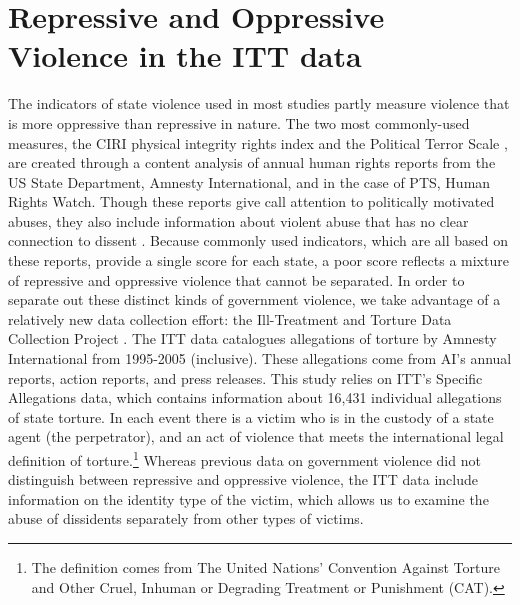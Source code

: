 \documentclass[11pt]{article}
\begin{document}
\section*{Repressive and Oppressive Violence in the ITT data} 
The indicators of state violence used in most studies partly measure violence that is more oppressive than repressive in nature. The two most commonly-used measures, the CIRI physical integrity rights index \citep{CIRI2014} and the Political Terror Scale \citep{PTS2018}, are created through a content analysis of annual human rights reports from the US State Department, Amnesty International, and in the case of PTS, Human Rights Watch. Though these reports give call attention to politically motivated abuses, they also include information about violent abuse that has no clear connection to dissent \citep[][pp.\ 13--16, 90--91]{Haschke2018}. Because commonly used indicators, which are all based on these reports, provide a single score for each state, a poor score reflects a mixture of repressive and oppressive violence that cannot be separated. In order to separate out these distinct kinds of government violence, we take advantage of a relatively new data collection effort: the Ill-Treatment and Torture Data Collection Project \citep{ConradHaglundMoore2014}. The ITT data catalogues allegations of torture by Amnesty International from 1995-2005 (inclusive). These allegations come from AI's annual reports, action reports, and press releases. This study relies on ITT's Specific Allegations data, which contains information about 16,431 individual allegations of state torture. In each event there is a victim who is in the custody of a state agent (the perpetrator), and an act of violence that meets the international legal definition of torture.\footnote{The definition comes from The United Nations' Convention Against Torture and Other Cruel, Inhuman or Degrading Treatment or Punishment (CAT).} Whereas previous data on government violence did not distinguish between repressive and oppressive violence, the ITT data include information on the identity type of the victim, which allows us to examine the abuse of dissidents separately from other types of victims. 
\end{document}
